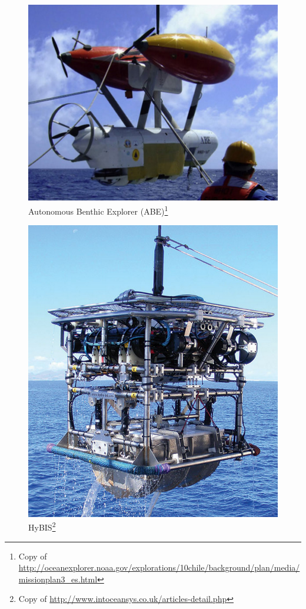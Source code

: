 \documentclass[xcolor=svgnames]{beamer}
\begin{document}
\begin{frame}
    \begin{figure}
      \includegraphics[scale=0.250]{5.png}
	\caption{Autonomous Benthic Explorer (ABE)\footnote{Copy  of \url{http://oceanexplorer.noaa.gov/explorations/10chile/background/plan/media/missionplan3_es.html}}}
    \end{figure}
\end{frame}

\begin{frame}
    \begin{figure}
      \includegraphics[scale=0.2350]{6.png}
	\caption{HyBIS\footnote{Copy  of \url{http://www.intoceansys.co.uk/articles-detail.php}}}
    \end{figure}
\end{frame}
\end{document}
